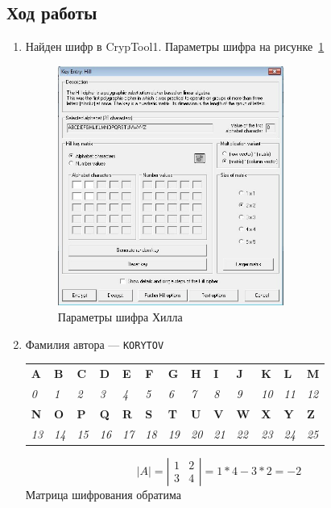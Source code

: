 \documentclass[a4paper, 14pt]{extarticle}
\begin{document}
\subsection{Ход работы}
\begin{enumerate}
    \item Найден шифр в CrypTool1. Параметры шифра на рисунке~\ref{img:1:1}
    \begin{figure}[h]
        \centering
        \includegraphics[width=0.7\textwidth]{./img/S003.jpg}
        \caption{Параметры шифра Хилла}%
        \label{img:1:1}
    \end{figure}
    \item Фамилия автора --- \texttt{KORYTOV}
    \begin{table}[h]
        \centering
        \begin{tabular}{@{}lllllllllllll@{}}
        \toprule
        \textbf{A} & \textbf{B} & \textbf{C} & \textbf{D} & \textbf{E} & \textbf{F} & \textbf{G} & \textbf{H} & \textbf{I} & \textbf{J} & \textbf{K} & \textbf{L} & \textbf{M} \\
        \textit{0} & \textit{1} & \textit{2} & \textit{3} & \textit{4} & \textit{5} & \textit{6} & \textit{7} & \textit{8} & \textit{9} & \textit{10} & \textit{11} & \textit{12} \\ \midrule
        \textbf{N} & \textbf{O} & \textbf{P} & \textbf{Q} & \textbf{R} & \textbf{S} & \textbf{T} & \textbf{U} & \textbf{V} & \textbf{W} & \textbf{X} & \textbf{Y} & \textbf{Z} \\
        \textit{13} & \textit{14} & \textit{15} & \textit{16} & \textit{17} & \textit{18} & \textit{19} & \textit{20} & \textit{21} & \textit{22} & \textit{23} & \textit{24} & \textit{25} \\ \bottomrule
        \end{tabular}
    \end{table}
    \begin{equation*}
        |A| = \left| \begin{matrix} 1 & 2 \\ 3 & 4 \end{matrix} \right| = 1 * 4 - 3 * 2 = -2
    \end{equation*}
    Матрица шифрования обратима


\end{enumerate}
\end{document}

